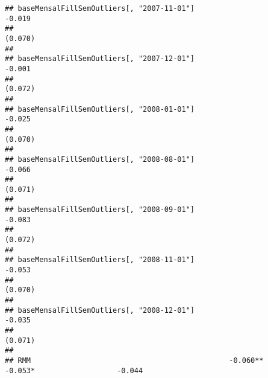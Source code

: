 \documentclass[
]{article}
\begin{document}
\begin{verbatim}
## baseMensalFillSemOutliers[, "2007-11-01"]                                                         -0.019           
##                                                                                                   (0.070)          
##                                                                                                                    
## baseMensalFillSemOutliers[, "2007-12-01"]                                                         -0.001           
##                                                                                                   (0.072)          
##                                                                                                                    
## baseMensalFillSemOutliers[, "2008-01-01"]                                                         -0.025           
##                                                                                                   (0.070)          
##                                                                                                                    
## baseMensalFillSemOutliers[, "2008-08-01"]                                                         -0.066           
##                                                                                                   (0.071)          
##                                                                                                                    
## baseMensalFillSemOutliers[, "2008-09-01"]                                                         -0.083           
##                                                                                                   (0.072)          
##                                                                                                                    
## baseMensalFillSemOutliers[, "2008-11-01"]                                                         -0.053           
##                                                                                                   (0.070)          
##                                                                                                                    
## baseMensalFillSemOutliers[, "2008-12-01"]                                                         -0.035           
##                                                                                                   (0.071)          
##                                                                                                                    
## RMM                                              -0.060**               -0.053*                   -0.044           

\end{verbatim}
\end{document}
